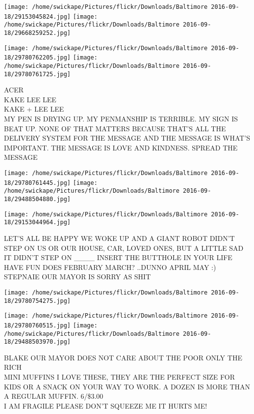 \documentclass[10pt,letterpaper]{article}
\begin{document}
\texttt{[image: /home/swickape/Pictures/flickr/Downloads/Baltimore 2016-09-18/29153045824.jpg]}
\texttt{[image: /home/swickape/Pictures/flickr/Downloads/Baltimore 2016-09-18/29668259252.jpg]}

\texttt{[image: /home/swickape/Pictures/flickr/Downloads/Baltimore 2016-09-18/29780762205.jpg]}
\texttt{[image: /home/swickape/Pictures/flickr/Downloads/Baltimore 2016-09-18/29780761725.jpg]}

ACER\\
KAKE LEE LEE\\
KAKE + LEE LEE\\
MY PEN IS DRYING UP.  MY PENMANSHIP IS TERRIBLE.  MY SIGN IS BEAT UP.  NONE OF THAT MATTERS BECAUSE THAT'S ALL THE DELIVERY SYSTEM FOR THE MESSAGE AND THE MESSAGE IS WHAT'S IMPORTANT.  THE MESSAGE IS LOVE AND KINDNESS.  SPREAD THE MESSAGE\\
\pagebreak

\texttt{[image: /home/swickape/Pictures/flickr/Downloads/Baltimore 2016-09-18/29780761445.jpg]}
\texttt{[image: /home/swickape/Pictures/flickr/Downloads/Baltimore 2016-09-18/29488504880.jpg]}

\vspace{0.25in}
\texttt{[image: /home/swickape/Pictures/flickr/Downloads/Baltimore 2016-09-18/29153044964.jpg]}

LET'S ALL BE HAPPY WE WOKE UP AND A GIANT ROBOT DIDN'T STEP ON US OR OUR HOUSE, CAR, LOVED ONES, BUT A LITTLE SAD IT DIDN'T STEP ON \_\_\_\_ INSERT THE BUTTHOLE IN YOUR LIFE\\
HAVE FUN DOES FEBRUARY MARCH?  ..DUNNO APRIL MAY :)\\
STEPNAIE OUR MAYOR IS SORRY AS SHIT\\
\pagebreak

\texttt{[image: /home/swickape/Pictures/flickr/Downloads/Baltimore 2016-09-18/29780754275.jpg]}

\vspace{0.25in}
\texttt{[image: /home/swickape/Pictures/flickr/Downloads/Baltimore 2016-09-18/29780760515.jpg]}
\texttt{[image: /home/swickape/Pictures/flickr/Downloads/Baltimore 2016-09-18/29488503970.jpg]}

BLAKE OUR MAYOR DOES NOT CARE ABOUT THE POOR ONLY THE RICH\\
MINI MUFFINS I LOVE THESE, THEY ARE THE PERFECT SIZE FOR KIDS OR A SNACK ON YOUR WAY TO WORK.  A DOZEN IS MORE THAN A REGULAR MUFFIN.  6/\$3.00\\
I AM FRAGILE PLEASE DON'T SQUEEZE ME IT HURTS ME!\\
\pagebreak
\end{document}
